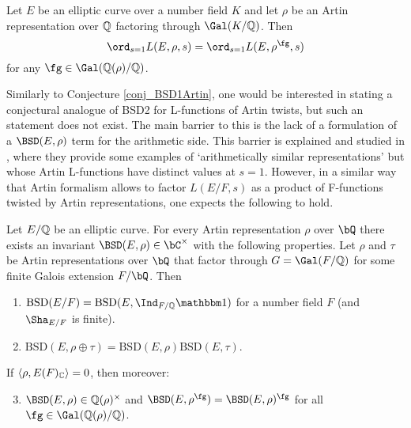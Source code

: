 \begin{conj}
    Let $E$ be an elliptic curve over a number field $K$ and let $\rho$ be an Artin representation over $\mathbb{Q}$ factoring through $\Gal(K/\QQ)$. Then
    $$\ord_{s=1}L(E,\rho,s)=\ord_{s=1}L(E,\rho^{\fg},s)$$
    for any $\fg\in\Gal(\QQ(\rho)/\QQ)$.
\end{conj}

Similarly to Conjecture \ref{conj_BSD1Artin}, one would be interested in stating a conjectural analogue of BSD2 for L-functions of Artin twists, but such an statement does not exist. The main barrier to this is the lack of a formulation of a $\BSD(E,\rho)$ term for the arithmetic side. This barrier is explained and studied in \cite[\S4]{DEW1}, where they provide some examples of `arithmetically similar representations' but whose Artin L-functions have distinct values at $s=1$. However, in a similar way that Artin formalism allows to factor $L(E/F,s)$ as a product of F-functions twisted by Artin representations, one expects the following to hold.

\begin{conj}{\cite[Conjecture 4]{DEW1}}\label{conj_conjecture4}
    Let $E/\mathbb{Q}$ be an elliptic curve. 
    For every Artin representation $\rho$ over $\bQ$ there exists an invariant $\BSD(E, \rho) \in \bC^{\times}$ with the following properties. 
    Let $\rho$ and $\tau$ be Artin representations over $\bQ$ that factor through $G = \Gal(F/\QQ)$ for some finite Galois extension $F / \bQ$. Then 
    \begin{enumerate}[label={\bfseries C\arabic*.}]
        \setlength\itemsep{0em}
        \item $\mathrm{BSD}(E/F)=\mathrm{BSD}(E,\Ind_{F/\QQ}\trivial)$ for a number field $F$ (and $\Sha_{E/F}$ is finite).
        \item $\mathrm{BSD}(E,\rho\oplus\tau)=\mathrm{BSD}(E,\rho)\mathrm{BSD}(E,\tau)$.
    \end{enumerate}       
        If $\langle\rho,E(F)_{\mathbb{C}}\rangle=0$, then moreover:
    \begin{enumerate}[label={\bfseries C\arabic*.}]
        \setcounter{enumi}{2}
       \item $\BSD(E,\rho)\in\QQ(\rho)^{\times}$ and $\BSD(E,\rho^{\fg})=\BSD(E,\rho)^{\fg}$ for all $\fg\in\Gal(\QQ(\rho)/\QQ)$.%
    \end{enumerate}
\end{conj}

